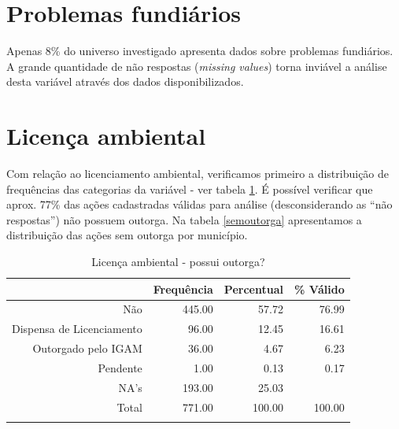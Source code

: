 \documentclass[a4paper, 12pt, openright, oneside, english, brazil, article]{abntex2}
\begin{document}
	
	\section{Problemas fundiários}
	Apenas 8\% do universo investigado apresenta dados sobre problemas fundiários. A grande quantidade de não respostas (\textit{missing values}) torna inviável a análise desta variável através dos dados disponibilizados.
	
	
	\section{Licença ambiental}
	
	Com relação ao licenciamento ambiental, verificamos primeiro a distribuição de frequências das categorias da variável - ver tabela \ref{outorga}. É possível verificar que aprox. 77\% das ações cadastradas válidas para análise (desconsiderando as ``não respostas'') não possuem outorga. Na tabela \ref{semoutorga} apresentamos a distribuição das ações sem outorga por município.
	
	\begin{scriptsize}
		\begin{longtable}{rrrr}
			\caption{Licença ambiental - possui outorga?} \\ 
			\hline
			& Frequência & Percentual & \% Válido \\ 
			\hline
			Não & 445.00 & 57.72 & 76.99 \\ 
			Dispensa de Licenciamento & 96.00 & 12.45 & 16.61 \\ 
			Outorgado pelo IGAM & 36.00 & 4.67 & 6.23 \\ 
			Pendente & 1.00 & 0.13 & 0.17 \\ 
			NA's & 193.00 & 25.03 &  \\ 
			\hline
			Total & 771.00 & 100.00 & 100.00 \\ 
			\hline
			\hline
			\label{outorga}
		\end{longtable}
	\end{scriptsize}
\end{document}
